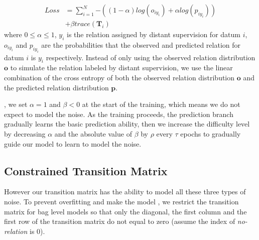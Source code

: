 \begin{equation}
\begin{aligned}
Loss	&=\sum_{i=1}^N{-((1-\alpha) log(o_{iy_{i}}) + \alpha log(p_{iy_{i}}))} \\
&+ \beta trace(\mathbf{T}_{i})
\end{aligned}
\end{equation}
where $0\le\alpha\le1$, $y_i$ is the relation assigned by distant supervision for datum $i$, $o_{iy_{i}}$ and $p_{iy_{i}}$ are the probabilities that the observed and predicted relation for datum $i$ is $y_i$ respectively. Instead of only using the observed relation distribution $\mathbf{o}$ to simulate the relation labeled by distant supervision, we use the linear combination of the cross entropy of both the observed relation distribution $\mathbf{o}$ and the predicted relation distribution $\mathbf{p}$.

, we set $\alpha=1$ and $\beta<0$ at the start of the training, which means we do not expect to model the noise. As the training proceeds, the prediction branch gradually learns the basic prediction ability, then we increase the difficulty level by decreasing $\alpha$ and the absolute value of $\beta$ by $\rho$ every $\tau$ epochs to gradually guide our model to learn to model the noise.

\subsection{Constrained Transition Matrix}
 However our transition matrix has the ability to model all these three types of noise. To prevent overfitting and make the model , we restrict the transition matrix for bag level models so that only the diagonal, the first column and the first row of the transition matrix do not equal to zero (assume the index of \emph{no-relation} is 0).
